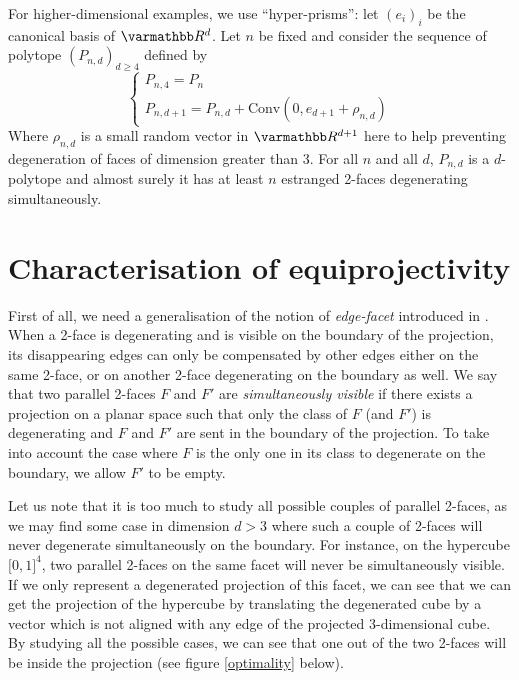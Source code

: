 \documentclass[12pt, notitlepage]{article}
\renewcommand{\mathbb}{\varmathbb}
\theoremstyle{plain}
\theoremstyle{definition}
\theoremstyle{plain}
\theoremstyle{remark}
\theoremstyle{plain}
\theoremstyle{plain}
\newcommand{\R}{\mathbb R}
\newcommand{\conv}{\text{Conv}}
\begin{document}
For higher-dimensional examples, we use “hyper-prisms”: let $(e_i)_i$ be the canonical basis of $\R^d$. Let $n$ be fixed and consider the sequence of polytope $(P_{n,d})_{d\geq4}$ defined by \[ \begin{cases}
    P_{n,4} = P_n \\
    P_{n,d+1} = P_{n,d} + \conv(0,e_{d+1} + \rho_{n,d})
\end{cases} \] Where $\rho_{n,d}$ is a small random vector in $\R^{d+1}$ here to help preventing degeneration of faces of dimension greater than 3. For all $n$ and all $d$, $P_{n,d}$ is a $d$-polytope and almost surely it has at least $n$ estranged 2-faces degenerating simultaneously.

\section{Characterisation of equiprojectivity}

First of all, we need a generalisation of the notion of \emph{edge-facet} introduced in \cite{MHAL}. When a 2-face is degenerating and is visible on the boundary of the projection, its disappearing edges can only be compensated by other edges either on the same 2-face, or on another 2-face degenerating on the boundary as well. We say that two parallel 2-faces $F$ and $F'$ are \emph{simultaneously visible} if there exists a projection on a planar space such that only the class of $F$ (and $F'$) is degenerating and $F$ and $F'$ are sent in the boundary of the projection. To take into account the case where $F$ is the only one in its class to degenerate on the boundary, we allow $F'$ to be empty.

Let us note that it is too much to study all possible couples of parallel 2-faces, as we may find some case in dimension $d>3$ where such a couple of 2-faces will never degenerate simultaneously on the boundary. For instance, on the hypercube $\mathopen [0,1 \mathclose]^4$, two parallel 2-faces on the same facet will never be simultaneously visible. If we only represent a degenerated projection of this facet, we can see that we can get the projection of the hypercube by translating the degenerated cube by a vector which is not aligned with any edge of the projected 3-dimensional cube. By studying all the possible cases, we can see that one out of the two 2-faces will be inside the projection (see figure \ref{optimality} below).
\end{document}
